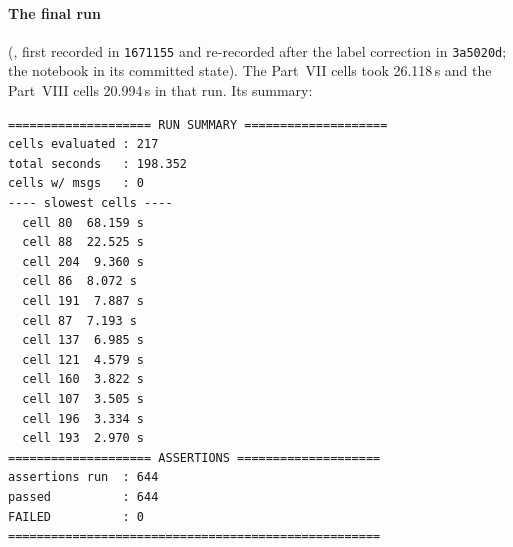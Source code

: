 \paragraph{The final run} (, first recorded in
\texttt{1671155} and re-recorded after the label correction in \texttt{3a5020d}; the notebook in its
committed state). The Part~VII cells took 26.118\,s and the Part~VIII cells 20.994\,s in that run. Its
summary:

\begin{Verbatim}[fontsize=\scriptsize]
==================== RUN SUMMARY ====================
cells evaluated : 217
total seconds   : 198.352
cells w/ msgs   : 0
---- slowest cells ----
  cell 80  68.159 s
  cell 88  22.525 s
  cell 204  9.360 s
  cell 86  8.072 s
  cell 191  7.887 s
  cell 87  7.193 s
  cell 137  6.985 s
  cell 121  4.579 s
  cell 160  3.822 s
  cell 107  3.505 s
  cell 196  3.334 s
  cell 193  2.970 s
==================== ASSERTIONS ====================
assertions run  : 644
passed          : 644
FAILED          : 0
====================================================
\end{Verbatim}


